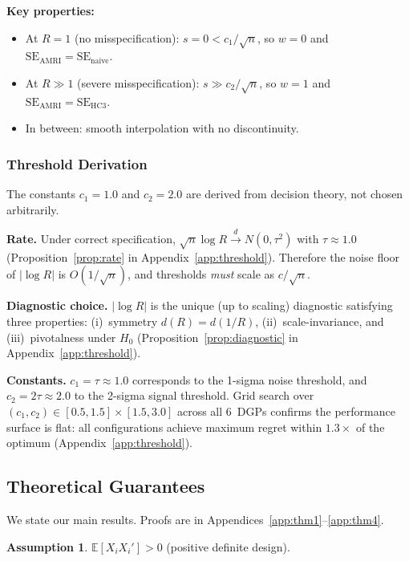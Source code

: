 \documentclass[12pt]{article}
\theoremstyle{definition}
\newtheorem{assumption}{Assumption}
\theoremstyle{remark}
\newcommand{\E}{\mathbb{E}}
\newcommand{\se}{\mathrm{SE}}
\newcommand{\dlim}{\overset{d}{\to}}
\begin{document}
\textbf{Key properties:}
\begin{itemize}[nosep]
\item At $R = 1$ (no misspecification): $s = 0 < c_1/\sqrt{n}$, so $w = 0$ and $\se_{\mathrm{AMRI}} = \se_{\mathrm{naive}}$.
\item At $R \gg 1$ (severe misspecification): $s \gg c_2/\sqrt{n}$, so $w = 1$ and $\se_{\mathrm{AMRI}} = \se_{\mathrm{HC3}}$.
\item In between: smooth interpolation with no discontinuity.
\end{itemize}

\subsubsection{Threshold Derivation}

The constants $c_1 = 1.0$ and $c_2 = 2.0$ are derived from decision theory, not chosen arbitrarily.

\textbf{Rate.} Under correct specification, $\sqrt{n} \log R \dlim N(0, \tau^2)$ with $\tau \approx 1.0$ (Proposition~\ref{prop:rate} in Appendix~\ref{app:threshold}). Therefore the noise floor of $|\log R|$ is $O(1/\sqrt{n})$, and thresholds \emph{must} scale as $c/\sqrt{n}$.

\textbf{Diagnostic choice.} $|\log R|$ is the unique (up to scaling) diagnostic satisfying three properties: (i)~symmetry $d(R) = d(1/R)$, (ii)~scale-invariance, and (iii)~pivotalness under $H_0$ (Proposition~\ref{prop:diagnostic} in Appendix~\ref{app:threshold}).

\textbf{Constants.} $c_1 = \tau \approx 1.0$ corresponds to the 1-sigma noise threshold, and $c_2 = 2\tau \approx 2.0$ to the 2-sigma signal threshold. Grid search over $(c_1, c_2) \in [0.5, 1.5] \times [1.5, 3.0]$ across all 6~DGPs confirms the performance surface is flat: all configurations achieve maximum regret within $1.3\times$ of the optimum (Appendix~\ref{app:threshold}).

\subsection{Theoretical Guarantees}\label{sec:theory}

We state our main results. Proofs are in Appendices~\ref{app:thm1}--\ref{app:thm4}.

\begin{assumption}\label{ass:A1}
$\E[X_i X_i'] > 0$ (positive definite design).
\end{assumption}
\end{document}
